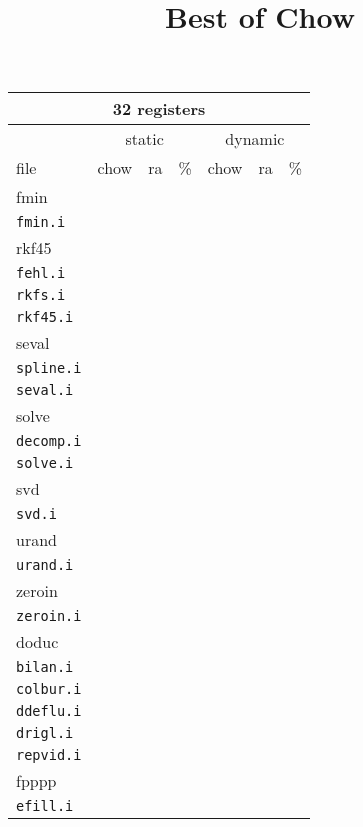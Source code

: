 \documentclass[11pt]{article}
\title{Best of Chow}
\begin{document}
\begin{tabular}{|l|r|r|r|r|r|r|}
\hline
\multicolumn{7}{|c|}{32 registers}\\
\hline
&\multicolumn{3}{c}{static}&\multicolumn{3}{|c|}{dynamic}\\
\hline
file&chow&ra&\%&chow&ra&\%\\
\hline
%
%
\multicolumn{7}{|l|}{fmin}\\
\hline
\texttt{fmin.i}&&&&&& \\
\hline
%
%
\multicolumn{7}{|l|}{rkf45}\\
\hline
\texttt{fehl.i}&&&&&& \\
\texttt{rkfs.i}&&&&&& \\
\texttt{rkf45.i}&&&&&& \\
%
%
\hline
\multicolumn{7}{|l|}{seval}\\
\hline
\texttt{spline.i}&&&&&& \\
\texttt{seval.i}&&&&&& \\
%
%
\hline
\multicolumn{7}{|l|}{solve}\\
\hline
\texttt{decomp.i}&&&&&& \\
\texttt{solve.i}&&&&&& \\
\hline
%
%
\multicolumn{7}{|l|}{svd}\\
\hline
\texttt{svd.i}&&&&&& \\
\hline
%
%
\multicolumn{7}{|l|}{urand}\\
\hline
\texttt{urand.i}&&&&&& \\
\hline
%
%
\multicolumn{7}{|l|}{zeroin}\\
\hline
\texttt{zeroin.i}&&&&&& \\
\hline
%
%
\multicolumn{7}{|l|}{doduc}\\
\hline
\texttt{bilan.i}&&&&&& \\
\texttt{colbur.i}&&&&&& \\
\texttt{ddeflu.i}&&&&&& \\
\texttt{drigl.i}&&&&&& \\
\texttt{repvid.i}&&&&&& \\
\hline
%
%
\multicolumn{7}{|l|}{fpppp}\\
\hline
\texttt{efill.i}&&&&&& \\
\hline

\hline
\end{tabular}
\end{document}
